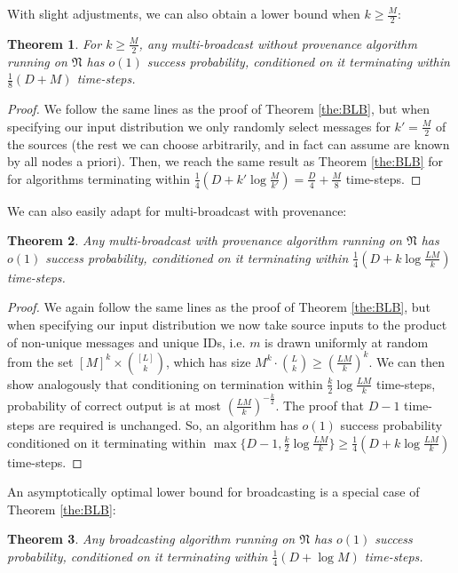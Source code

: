 \documentclass{article}
\newtheorem{theorem}{Theorem}
\newcommand{\net}{\ensuremath{\mathfrak{N}}\xspace}
\begin{document}
With slight adjustments, we can also obtain a lower bound when $k\geq \frac M2$:

\begin{theorem}
	\label{the:BLB2}
	For $k\geq\frac M2$, any multi-broadcast without provenance algorithm running on $\net$ has $o(1)$ success probability, conditioned on it terminating within $\frac 18(D+M)$ time-steps.
\end{theorem}

\begin{proof}
	We follow the same lines as the proof of Theorem \ref{the:BLB}, but when specifying our input distribution we only randomly select messages for $k' = \frac M2$ of the sources (the rest we can choose arbitrarily, and in fact can assume are known by all nodes a priori). Then, we reach the same result as Theorem \ref{the:BLB} for for algorithms terminating within $\frac 14(D+k'\log \frac {M}{k'}) = \frac D4+\frac M8$ time-steps.
\end{proof}

We can also easily adapt for multi-broadcast with provenance:

\begin{theorem}
	\label{the:BLB3}
	Any multi-broadcast with provenance algorithm running on $\net$ has $o(1)$ success probability, conditioned on it terminating within $\frac 14(D+k\log \frac {LM}{k})$ time-steps. 
\end{theorem}

\begin{proof}
	We again follow the same lines as the proof of Theorem \ref{the:BLB}, but when specifying our input distribution we now take source inputs to the product of non-unique messages and unique IDs, i.e. $m$ is drawn uniformly at random from the set $[M]^k \times \binom{[L]}{k}$, which has size $M^k\cdot \binom Lk \geq \left(\frac{LM}{k}\right)^k$. We can then show analogously that conditioning on termination within $\frac k2\log \frac {LM}{k}$ time-steps, probability of correct output is at most $\left(\frac {LM}{k}\right)^{-\frac k2}$. The proof that $D-1$ time-steps are required is unchanged. So, an algorithm has $o(1)$ success probability conditioned on it terminating within $\max\{D-1,\frac k2\log \frac {LM}{k}\}\geq\frac 14(D+k\log \frac {LM}{k})$ time-steps.
\end{proof}

An asymptotically optimal lower bound for broadcasting is a special case of Theorem \ref{the:BLB}:

\begin{theorem}
	\label{the:BLB4}
	Any broadcasting algorithm running on $\net$ has $o(1)$ success probability, conditioned on it terminating within $\frac 14(D+\log M)$ time-steps. 
\end{theorem}
\end{document}
